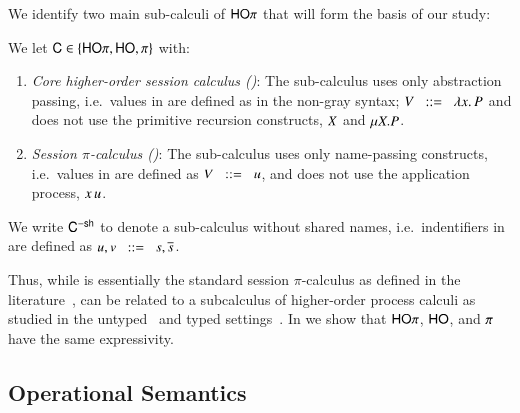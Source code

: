 We identify two main sub-calculi of $\mathsf{HO}\pi$
that will form the basis of our study:
%
\begin{definition}\rm
	We let $\mathsf{C} \in \{\mathsf{HO}\pi, \mathsf{HO}, \pi\}$ with:
%
	\begin{enumerate}[-]
		\item	{\em Core higher-order session calculus (\HO)}:
			The sub-calculus \HO uses only abstraction passing, i.e.~values
			in 
			are defined as in the non-gray syntax;
			$V \;\;::=\;\; \lambda x.\,P$ and does not use the primitive
			recursion constructs, $X$ and $\mu X. P$.

		\item	{\em Session $\pi$-calculus (\sessp)}:
			The sub-calculus \sessp uses only name-passing constructs, i.e.~values
			in 
			are defined as $V \;\;::=\;\; u$, and does not use the application process,
			$x\,u$.
	\end{enumerate}
%
	We write $\mathsf{C}^\mathsf{-sh}$ to denote a sub-calculus without shared names,
	i.e.~indentifiers in  are defined as $u,v \;\;::=\;\; s, \overline{s}$.
\end{definition}
%
Thus, while \sessp is essentially the standard session $\pi$-calculus
as defined in the literature~\cite{honda.vasconcelos.kubo:language-primitives,GH05},
\HO can be related to a subcalculus of higher-order process calculi as studied
in the untyped~\cite{San923,SangiorgiD:picatomp,JeffreyR05}
and typed settings~\cite{tlca07,mostrous09sessionbased}.
In  we show that 
$\mathsf{HO}\pi$, $\mathsf{HO}$, and $\pi$ have the same expressivity.

\subsection{Operational Semantics}

\label{subsec:reduction_semantics}

